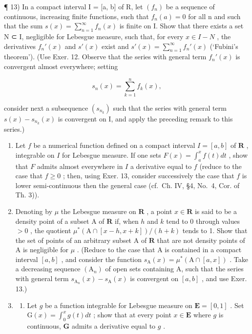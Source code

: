 ¶ 13) In a compact interval I = {[}a, b{]} of R, let \((f_n)\) be a sequence of continuous, increasing finite functions, such that \(f_n(a) = 0\) for all n and such that the sum \(s(x) = \sum_{n=1}^{\infty} f_n(x)\) is finite on I. Show that there exists a set N ⊂ I, negligible for Lebesgue measure, such that, for every \(x \in I - N\) , the derivatives \(f_n'(x)\) and \(s'(x)\) exist and \(s'(x) = \sum_{n=1}^{\infty} f_n'(x)\) (`Fubini's theorem'). (Use Exer. 12. Observe that the series with general term \(f_n'(x)\) is convergent almost everywhere; setting

\[
s _ {n} (x) = \sum_ {k = 1} ^ {n} f _ {k} (x),
\]

consider next a subsequence \((s_{n_k})\) such that the series with general term \(s(x) - s_{n_k}(x)\) is convergent on I, and apply the preceding remark to this series.)

\begin{enumerate}
\def\labelenumi{\arabic{enumi})}
\setcounter{enumi}{13}
\item
  Let \(f\) be a numerical function defined on a compact interval \(I = [a, b]\) of \(\mathbf{R}\) , integrable on \(I\) for Lebesgue measure. If one sets \(F(x) = \int_{a}^{x} f(t) dt\) , show that \(F\) admits almost everywhere in \(I\) a derivative equal to \(f\) (reduce to the case that \(f \geqslant 0\) ; then, using Exer. 13, consider successively the case that \(f\) is lower semi-continuous then the general case (cf.~Ch. IV, §4, No.~4, Cor. of Th. 3)).
\item
  Denoting by \(\mu\) the Lebesgue measure on \(\mathbf{R}\) , a point \(x \in \mathbf{R}\) is said to be a density point of a subset A of \(\mathbf{R}\) if, when \(h\) and \(k\) tend to 0 through values \(>0\) , the quotient \(\mu^{*}(\mathrm{A} \cap [x - h, x + k]) / (h + k)\) tends to 1. Show that the set of points of an arbitrary subset A of \(\mathbf{R}\) that are not density points of A is negligible for \(\mu\) . (Reduce to the case that A is contained in a compact interval \([a, b]\) , and consider the function \(s_{\mathrm{A}}(x) = \mu^{*}(\mathrm{A} \cap [a, x])\) . Take a decreasing sequence \((\mathrm{A}_n)\) of open sets containing A, such that the series with general term \(s_{\mathrm{A}_n}(x) - s_{\mathrm{A}}(x)\) is convergent on \([a, b]\) , and use Exer. 13.)
\item
  \begin{enumerate}
  \def\labelenumii{\alph{enumii})}
  \tightlist
  \item
    Let \(g\) be a function integrable for Lebesgue measure on \(\mathbf{E} = [0,1]\) . Set \(\mathrm{G}(x) = \int_0^x g(t)dt\) ; show that at every point \(x \in \mathbf{E}\) where \(g\) is continuous, \(\mathbf{G}\) admits a derivative equal to \(g\) .
  \end{enumerate}
\end{enumerate}

